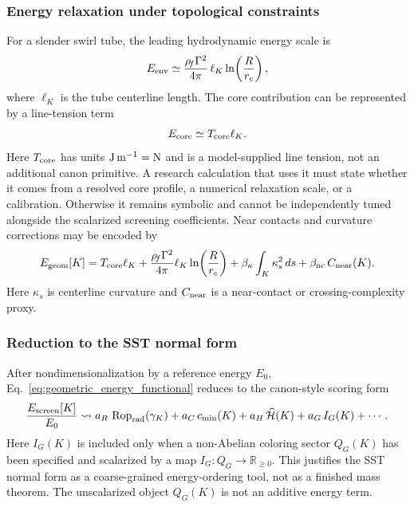 \subsubsection{Energy relaxation under topological constraints}
For a slender swirl tube, the leading hydrodynamic energy scale is
\begin{equation}
    E_{\rm env}
    \simeq
    \frac{\rho_{\!f}\Gamma^2}{4\pi}\,\ell_K\ln\!\left(\frac{R}{r_c}\right),
    \label{eq:env_energy_tfm}
\end{equation}
where $\ell_K$ is the tube centerline length. The core contribution can be represented by a line-tension term
\begin{equation}
    E_{\rm core}\simeq T_{\rm core}\ell_K.
    \label{eq:core_line_tension}
\end{equation}
Here $T_{\rm core}$ has units ${\rm J\,m^{-1}}={\rm N}$ and is a
model-supplied line tension, not an additional canon primitive.  A research
calculation that uses it must state whether it comes from a resolved core
profile, a numerical relaxation scale, or a calibration.  Otherwise it remains
symbolic and cannot be independently tuned alongside the scalarized screening
coefficients.
Near contacts and curvature corrections may be encoded by
\begin{equation}
    E_{\rm geom}[K]
    =T_{\rm core}\ell_K
    +\frac{\rho_{\!f}\Gamma^2}{4\pi}\ell_K\ln\!\left(\frac{R}{r_c}\right)
    +\beta_{\kappa}\int_K \kappa_s^2\,ds
    +\beta_{\rm nc}\,C_{\rm near}(K).
    \label{eq:geometric_energy_functional}
\end{equation}
Here $\kappa_s$ is centerline curvature and $C_{\rm near}$ is a near-contact or crossing-complexity proxy.

\subsubsection{Reduction to the SST normal form}
After nondimensionalization by a reference energy $E_0$, Eq.~\eqref{eq:geometric_energy_functional} reduces to the canon-style scoring form
\begin{equation}
    \frac{E_{\rm screen}[K]}{E_0}
    \leadsto
    a_R\,\operatorname{Rop}_{\rm rad}(\gamma_K)
    +a_C\,c_{\min}(K)
    +a_H\,\widehat{\mathcal H}(K)
    +a_G\,I_G(K)
    +\cdots .
    \label{eq:tfm_to_sst_eff}
\end{equation}
Here $I_G(K)$ is included only when a non-Abelian coloring sector $Q_G(K)$ has been specified and scalarized by a map $I_G:Q_G\to\mathbb R_{\ge0}$. This justifies the SST normal form as a coarse-grained energy-ordering tool, not as a finished mass theorem.  The unscalarized object $Q_G(K)$ is not an additive energy term.

